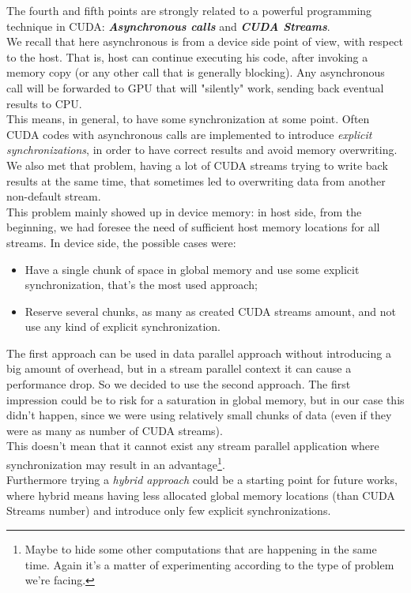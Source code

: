 The fourth and fifth points are strongly related to a powerful programming technique in CUDA:\textit{\textbf{ Asynchronous calls}} and \textit{\textbf{CUDA Streams}}.\\
We recall that here asynchronous is from a device side point of view, with respect to the host. That is, host can continue executing his code, after invoking a memory copy (or any other call that is generally blocking). Any asynchronous call will be forwarded to GPU that will "silently" work, sending back eventual results to CPU.\\
This means, in general, to have some synchronization at some point. Often CUDA codes with asynchronous calls are implemented to introduce \textit{explicit synchronizations}, in order to have correct results and avoid memory overwriting.\\
We also met that problem, having a lot of CUDA streams trying to write back results at the same time, that sometimes led to overwriting data from another non-default stream.\\
This problem mainly showed up in device memory: in host side, from the beginning, we had foresee the need of sufficient host memory locations for all streams. In device side, the possible cases were:
\begin{itemize}
	\item Have a single chunk of space in global memory and use some explicit synchronization, that's the most used approach;
	\item Reserve several chunks, as many as created CUDA streams amount, and not use any kind of explicit synchronization.
\end{itemize}
 The first approach can be used in data parallel approach without introducing a big amount of overhead, but in a stream parallel context it can cause a performance drop. So we decided to use the second approach. The first impression could be to risk for a saturation in global memory, but in our case this didn't happen, since we were using relatively small chunks of data (even if they were as many as number of CUDA streams).\\
 This doesn't mean that it cannot exist any stream parallel application where synchronization may result in an advantage\footnote{Maybe to hide some other computations that are happening in the same time. Again it's a matter of experimenting according to the type of problem we're facing.}.\\
 Furthermore trying a \textit{hybrid approach} could be a starting point for future works, where hybrid means having less allocated global memory locations (than CUDA Streams number) and introduce only few explicit synchronizations.\\
 
